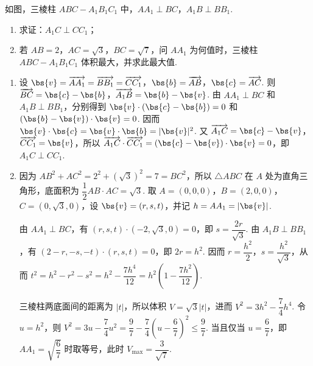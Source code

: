 \begin{problem}
如图，三棱柱 \(ABC - A_{1}B_{1}C_{1}\) 中，\(AA_{1} \perp BC\)，\(A_{1}B \perp BB_{1}\).
\begin{enumerate}
\item 求证：\(A_{1}C \perp CC_{1}\)；
\item 若 \(AB = 2\)，\(AC = \sqrt{3}\)，\(BC = \sqrt{7}\)，问 \(AA_{1}\) 为何值时，三棱柱 \(ABC-A_{1}B_{1}C_{1}\) 体积最大，并求此最大值.
\end{enumerate}
\FloatBarrier
\end{problem}

\begin{solution}
\begin{enumerate}
\item 设 \(\bs{v}=\overrightarrow{AA_1}=\overrightarrow{BB_1}=\overrightarrow{CC_1}\)，\(\bs{b}=\overrightarrow{AB}\)，\(\bs{c}=\overrightarrow{AC}\). 则 \(\overrightarrow{BC}=\bs{c}-\bs{b}\)，\(\overrightarrow{A_1B}=\bs{b}-\bs{v}\). 由 \(AA_1\perp BC\) 和 \(A_1B\perp BB_1\)，分别得到 \(\bs{v}\mathbin{\cdot}(\bs{c}-\bs{b})=0\) 和 \((\bs{b}-\bs{v})\mathbin{\cdot}\bs{v}=0\). 因而 \(\bs{v}\mathbin{\cdot}\bs{c}=\bs{v}\mathbin{\cdot}\bs{b}=|\bs{v}|^2\). 又 \(\overrightarrow{A_1C}=\bs{c}-\bs{v}\)，\(\overrightarrow{CC_1}=\bs{v}\)，所以
\(\overrightarrow{A_1C}\mathbin{\cdot}\overrightarrow{CC_1}=(\bs{c}-\bs{v})\mathbin{\cdot}\bs{v}=0\)，即 \(A_1C\perp CC_1\).
\item 因为 \(AB^2+AC^2=2^2+(\sqrt3)^2=7=BC^2\)，所以 \(\triangle ABC\) 在 \(A\) 处为直角三角形，底面积为 \(\dfrac12 AB\cdot AC=\sqrt3\). 取 \(A=(0,0,0)\)，\(B=(2,0,0)\)，\(C=(0,\sqrt3,0)\)，设 \(\bs{v}=(r,s,t)\)，并记 \(h=AA_1=|\bs{v}|\).

由 \(AA_1\perp BC\)，有 \((r,s,t)\mathbin{\cdot}(-2,\sqrt3,0)=0\)，即 \(s=\dfrac{2r}{\sqrt3}\). 由 \(A_1B\perp BB_1\)，有 \((2-r,-s,-t)\mathbin{\cdot}(r,s,t)=0\)，即 \(2r=h^2\). 因而 \(r=\dfrac{h^2}{2}\)，\(s=\dfrac{h^2}{\sqrt3}\)，从而
\(t^2=h^2-r^2-s^2=h^2-\dfrac{7h^4}{12}=h^2\left(1-\dfrac{7h^2}{12}\right)\).

三棱柱两底面间的距离为 \(\lvert t\rvert\)，所以体积 \(V=\sqrt3\lvert t\rvert\)，进而 \(V^2=3h^2-\dfrac74h^4\). 令 \(u=h^2\)，则
\(V^2=3u-\dfrac74u^2=\dfrac97-\dfrac74\left(u-\dfrac67\right)^2\leqslant\dfrac97\).
当且仅当 \(u=\dfrac67\)，即 \(AA_1=\sqrt{\dfrac67}\) 时取等号，此时 \(V_{\max}=\dfrac3{\sqrt7}\).
\end{enumerate}
\end{solution}

